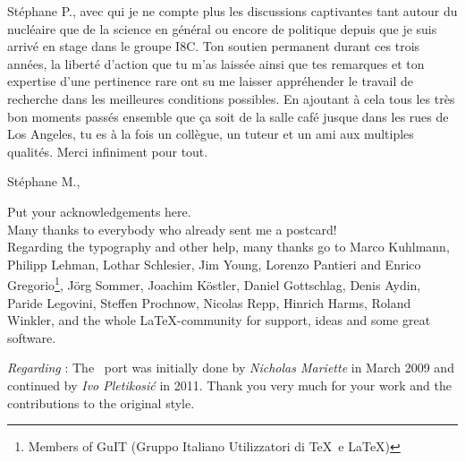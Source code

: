 \npar

Stéphane P., avec qui je ne compte plus les discussions captivantes tant autour du nucléaire que de la science en général ou encore de politique depuis que je suis arrivé en stage dans le groupe I8C.  Ton soutien permanent durant ces trois années, la liberté d'action que tu m'as laissée ainsi que tes remarques et ton expertise d'une pertinence rare ont su me laisser appréhender le travail de recherche dans les meilleures conditions possibles. En ajoutant à cela tous les très bon moments passés ensemble que ça soit de la salle café jusque dans les rues de Los Angeles, tu es à la fois un collègue, un tuteur et un ami aux multiples qualités. Merci infiniment pour tout.

Stéphane M., 



\noindent Put your acknowledgements here.\\

\noindent Many thanks to everybody who already sent me a postcard!\\

\noindent Regarding the typography and other help, many thanks go to Marco Kuhlmann, Philipp Lehman, Lothar Schlesier, Jim Young, Lorenzo Pantieri and Enrico Gregorio\footnote{Members of GuIT (Gruppo Italiano Utilizzatori di \TeX\ e \LaTeX )}, J\"org Sommer, Joachim K\"ostler, Daniel Gottschlag, Denis Aydin, Paride Legovini, Steffen Prochnow, Nicolas Repp, Hinrich Harms, Roland Winkler, and the whole \LaTeX-community for support, ideas and some great software.

\bigskip

\noindent\emph{Regarding \mLyX}: The \mLyX\ port was initially done by
\emph{Nicholas Mariette} in March 2009 and continued by
\emph{Ivo Pletikosi\'c} in 2011. Thank you very much for your work and the contributions to the original style.

\endgroup